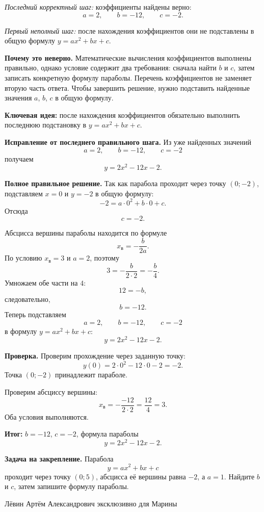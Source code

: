 \documentclass[12pt,a4paper]{article}
\begin{document}
\emph{Последний корректный шаг:} коэффициенты найдены верно:
\[
a=2, \qquad b=-12, \qquad c=-2.
\]

\emph{Первый неполный шаг:} после нахождения коэффициентов они не подставлены в общую формулу $y=ax^2+bx+c$.

\textbf{Почему это неверно.}
Математические вычисления коэффициентов выполнены правильно, однако условие содержит два требования: сначала найти $b$ и $c$, затем записать конкретную формулу параболы. Перечень коэффициентов не заменяет вторую часть ответа. Чтобы завершить решение, нужно подставить найденные значения $a$, $b$, $c$ в общую формулу.

\textcolor{blue!60!black}{\textbf{Ключевая идея:}} после нахождения коэффициентов обязательно выполнить последнюю подстановку в $y=ax^2+bx+c$.

\textbf{Исправление от последнего правильного шага.}
Из уже найденных значений
\[
a=2, \qquad b=-12, \qquad c=-2
\]
получаем
\[
y=2x^2-12x-2.
\]

\textbf{Полное правильное решение.}
Так как парабола проходит через точку $(0;-2)$, подставляем $x=0$ и $y=-2$ в общую формулу:
\[
-2=a\cdot 0^2+b\cdot 0+c.
\]
Отсюда
\[
c=-2.
\]

Абсцисса вершины параболы находится по формуле
\[
x_{\text{в}}=-\frac{b}{2a}.
\]
По условию $x_{\text{в}}=3$ и $a=2$, поэтому
\[
3=-\frac{b}{2\cdot 2}=-\frac{b}{4}.
\]
Умножаем обе части на $4$:
\[
12=-b,
\]
следовательно,
\[
b=-12.
\]
Теперь подставляем
\[
a=2, \qquad b=-12, \qquad c=-2
\]
в формулу $y=ax^2+bx+c$:
\[
y=2x^2-12x-2.
\]

\textbf{Проверка.}
Проверим прохождение через заданную точку:
\[
y(0)=2\cdot 0^2-12\cdot 0-2=-2.
\]
Точка $(0;-2)$ принадлежит параболе.

Проверим абсциссу вершины:
\[
x_{\text{в}}=-\frac{-12}{2\cdot 2}=\frac{12}{4}=3.
\]
Оба условия выполняются.

\textcolor{teal!60!black}{\textbf{Итог:}} $b=-12$, $c=-2$, формула параболы
\[
y=2x^2-12x-2.
\]

\textbf{Задача на закрепление.}
Парабола
\[
y=ax^2+bx+c
\]
проходит через точку $(0;5)$, абсцисса её вершины равна $-2$, а $a=1$. Найдите $b$ и $c$, затем запишите формулу параболы.

\vfill
\begin{center}
\footnotesize Лёвин Артём Александрович эксклюзивно для Марины
\end{center}
\end{document}
